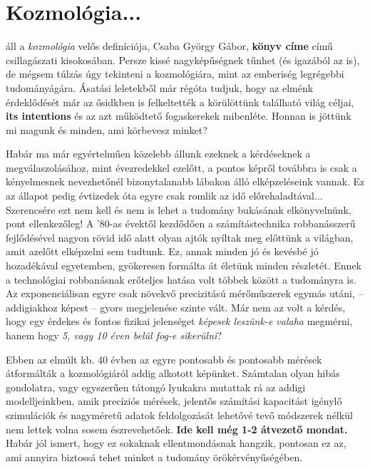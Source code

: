 \section{Kozmológia...}
 áll a \textit{kozmológia} velős definíciója, Csaba György Gábor, \textbf{könyv címe} című csillagászati kisokosában. Persze kissé nagyképűségnek tűnhet (és igazából az is), de mégsem túlzás úgy tekinteni a kozmológiára, mint az emberiség legrégebbi tudományágára. Ásatási leletekből már régóta tudjuk, hogy az elménk érdeklődését már az ősidkben is felkeltették a körülöttünk található világ céljai, \textbf{its intentions} és az azt működtető fogaskerekek mibenléte. Honnan is jöttünk mi magunk és minden, ami körbevesz minket?

Habár ma már egyértelműen közelebb állunk ezeknek a kérdéseknek a megválaszolásához, mint évezredekkel ezelőtt, a pontos képről továbbra is csak a kényelmesnek nevezhetőnél bizonytalanabb lábakon álló elképzeléseink vannak. Ez az állapot pedig évtizedek óta egyre csak romlik az idő előrehaladtával... Szerencsére ezt nem kell és nem is lehet a tudomány bukásának elkönyvelnünk, pont ellenkezőleg! A '80-as évektől kezdődően a számítástechnika robbanásszerű fejlődésével nagyon rövid idő alatt olyan ajtók nyíltak meg előttünk a világban, amit azelőtt elképzelni sem tudtunk. Ez, annak minden jó és kevésbé jó hozadékával egyetemben, gyökeresen formálta át életünk minden részletét. Ennek a technológiai robbanásnak erőteljes hatása volt többek között a tudományra is. Az exponenciálisan egyre csak növekvő precizitású mérőműszerek egymás utáni, -- addigiakhoz képest -- gyors megjelenése szinte  vált. Már nem az volt a kérdés, hogy egy érdekes és fontos fizikai jelenséget \textit{képesek leszünk-e valaha} megmérni, hanem hogy \textit{5, vagy 10 éven belül fog-e sikerülni}?

Ebben az elmúlt kb. 40 évben az egyre pontosabb és pontosabb mérések átformálták a kozmológiáról addig alkotott képünket. Számtalan olyan hibás gondolatra, vagy egyszerűen tátongó lyukakra mutattak rá az addigi modelljeinkben, amik precíziós mérések, jelentős számítási kapacitást igénylő szimulációk és nagyméretű adatok feldolgozását lehetővé tevő módszerek nélkül nem lettek volna sosem észrevehetőek. \textbf{Ide kell még 1-2 átvezető mondat.} Habár jól ismert, hogy ez sokaknak ellentmondásnak hangzik, pontosan ez az, ami annyira biztossá tehet minket a tudomány örökérvényűségében.